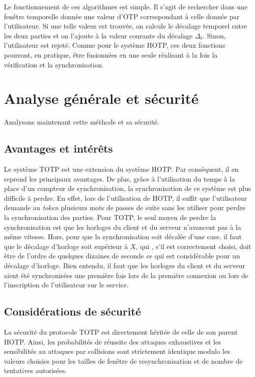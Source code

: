 \documentclass{../res/univ-projet}
\begin{document}
    Le fonctionnement de ces algorithmes est simple. Il s'agit de rechercher dans une fenêtre temporelle donnée une valeur d'OTP correspondant à celle donnée par 
    l'utilisateur. Si une telle valeur est trouvée, on calcule le décalage temporel entre les deux parties et on l'ajoute à la valeur courante du décalage $\Delta_t$.
    Sinon, l'utilisateur est rejeté.
    Comme pour le système \og{}HOTP\fg{}, ces deux fonctions pourront, en pratique, être fusionnées en une seule réalisant à la fois la vérification et la 
    synchronisation.
  
\section{Analyse générale et sécurité}
Analysons maintenant cette méthode et sa sécurité.

  \subsection{Avantages et intérêts}
  Le système \og{}TOTP\fg{} est une extension du système \og{}HOTP\fg{}. Par conséquent, il en reprend les principaux avantages. De plus, grâce à l'utilisation du temps 
  à la place d'un compteur de synchronisation, la synchronisation de ce système est plus difficile à perdre. En effet, lors de l'utilisation de \og{}HOTP\fg{}, il suffit 
  que l'utilisateur demande au \emph{token} plusieurs mots de passes de suite sans les utiliser pour perdre la synchronisation des parties. Pour \og{}TOTP\fg{}, le seul 
  moyen de perdre la synchronisation est que les horloges du client et du serveur n'avancent pas à la même vitesse. Hors, pour que la synchronisation soit décalée d'une 
  \og{}case\fg{}, il faut que le décalage d'horloge soit supérieur à $X$, qui , s'il est correctement choisi, doit être de l'ordre de quelques dizaines de seconde
  ce qui est considérable pour un décalage d'horloge. Bien entendu, il faut que les horloges du client et du serveur aient été synchronisées une première fois lors de 
  la première connexion ou lors de l'inscription de l'utilisateur sur le service.
  
  \subsection{Considérations de sécurité}
  La sécurité du protocole TOTP est directement héritée de celle de son parent HOTP. Ainsi, les probabilités de réussite des attaques exhaustives et les sensibilités au attaques 
  par collisions sont strictement identique modulo les valeurs choisies pour les tailles de fenêtre de resynchronisation et de nombre de tentatives autorisées.
  
\end{document}
